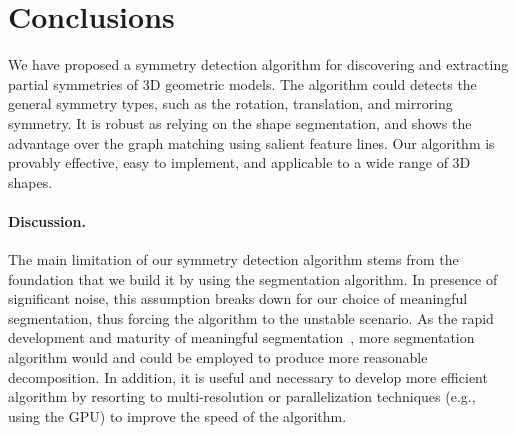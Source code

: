 \section{Conclusions}
\label{sec:con}

We have proposed a symmetry detection algorithm for discovering and extracting partial symmetries of 3D geometric models.
The algorithm could detects the general symmetry types, such as the rotation, translation, and mirroring symmetry.
It is robust as relying on the shape segmentation, and shows the advantage over the graph matching using salient feature lines.
Our algorithm is provably effective, easy to implement, and applicable to a wide range of 3D shapes.

\paragraph{Discussion.} 
The main limitation of our symmetry detection algorithm stems from the foundation that we build it by using the segmentation algorithm.
In presence of significant noise, this assumption breaks down for our choice of meaningful segmentation, 
thus forcing the algorithm to the unstable scenario.
As the rapid development and maturity of meaningful segmentation~\cite{Shamir2008}, 
more segmentation algorithm would and could be employed to produce more reasonable decomposition.
In addition, it is useful and necessary to develop more efficient algorithm by resorting to multi-resolution or parallelization
techniques (e.g., using the GPU) to improve the speed of the algorithm.
